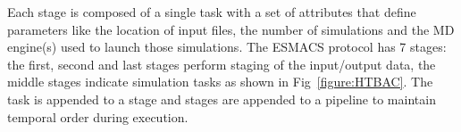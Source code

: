 
Each stage is composed of a single %
task with
a set of attributes that define %
parameters %
like the location of input files, the number of simulations and the MD
engine(s) used to launch those simulations. The ESMACS protocol %
has 7 stages: %
the first, second and last stages perform staging of the input/output data,
the middle stages indicate simulation tasks as shown in
Fig~\ref{figure:HTBAC}. The task is appended to a stage and stages are
appended to a pipeline to maintain temporal order during execution. 



